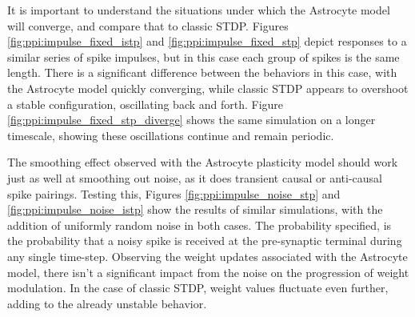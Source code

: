 

It is important to understand the situations under which the Astrocyte model
will converge, and compare that to classic STDP. Figures
\ref{fig:ppi:impulse_fixed_istp} and \ref{fig:ppi:impulse_fixed_stp} depict
responses to a similar series of spike impulses, but in this case each group of
spikes is the same length. There is a significant difference between the
behaviors in this case, with the Astrocyte model quickly converging, while
classic STDP appears to overshoot a stable configuration, oscillating back and
forth. Figure \ref{fig:ppi:impulse_fixed_stp_diverge} shows the same simulation
on a longer timescale, showing these oscillations continue and remain periodic.




The smoothing effect observed with the Astrocyte plasticity model should work
just as well at smoothing out noise, as it does transient causal or anti-causal
spike pairings. Testing this, Figures \ref{fig:ppi:impulse_noise_stp} and
\ref{fig:ppi:impulse_noise_istp} show the results of similar simulations, with
the addition of uniformly random noise in both cases. The probability specified,
is the probability that a noisy spike is received at the pre-synaptic
terminal during any single time-step. Observing the weight updates associated
with the Astrocyte model, there isn't a significant impact from the noise on the
progression of weight modulation. In the case of classic STDP, weight values
fluctuate even further, adding to the already unstable behavior.

